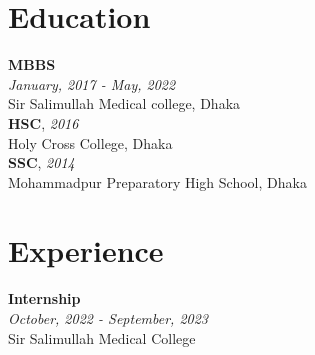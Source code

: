 \documentclass[a4paper,12pt]{article}
\newcommand{\resumeentry}[2]{
    \textbf{#1} \\
    \textit{#2}
}
\begin{document}
\hspace{1cm}
\begin{minipage}[t][12cm]{0.58\textwidth}

\section*{Education}
  \resumeentry{MBBS}{January, 2017 - May, 2022}\\ Sir Salimullah Medical college, Dhaka \vspace{0.2cm} \\
  \textbf{HSC}, \textit{2016}\\ Holy Cross College, Dhaka \vspace{0.2cm} \\
  \textbf{SSC}, \textit{2014}\\ Mohammadpur Preparatory High School, Dhaka \\

\section*{Experience}
\resumeentry{Internship}{October, 2022 - September, 2023}\\ Sir Salimullah Medical College \vspace{0.2cm}\\
\end{minipage}
\end{document}
